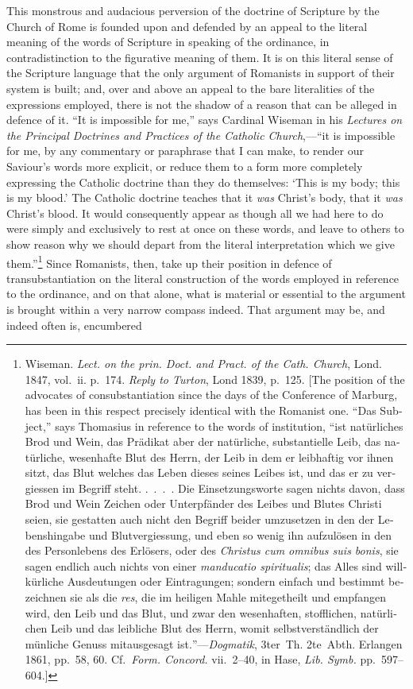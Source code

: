 \documentclass[
]{book}
\begin{document}
This monstrous and audacious perversion of the doctrine of Scripture by the Church of Rome is founded upon and defended by an appeal to the literal meaning of the words of Scripture in speaking of the ordinance, in contradistinction to the figurative meaning of them. It is on this literal sense of the Scripture language that the only argument of Romanists in support of their system is built; and, over and above an appeal to the bare literalities of the expressions employed, there is not the shadow of a reason that can be alleged in defence of it. ``It is impossible for me,'' says Cardinal Wiseman in his \emph{Lectures on the Principal Doctrines and Practices of the Catholic Church},---``it is impossible for me, by any commentary or paraphrase that I can make, to render our Saviour's words more explicit, or reduce them to a form more completely expressing the Catholic doctrine than they do themselves: `This is my body; this is my blood.' The Catholic doctrine teaches that it \emph{was} Christ's body, that it \emph{was} Christ's blood. It would consequently appear as though all we had here to do were simply and exclusively to rest at once on these words, and leave to others to show reason why we should depart from the literal interpretation which we give them.''\footnote{Wiseman. \emph{Lect. on the prin. Doct. and Pract. of the Cath. Church}, Lond. 1847, vol.~ii. p.~174. \emph{Reply to Turton}, Lond 1839, p.~125. {[}The position of the advocates of consubstantiation since the days of the Conference of Marburg, has been in this respect precisely identical with the Romanist one. ``\foreignlanguage{ngerman}{Das Subject},'' says Thomasius in reference to the words of institution, ``\foreignlanguage{ngerman}{ist natürliches Brod und Wein, das Prädikat aber der natürliche, substantielle Leib, das natürliche, wesenhafte Blut des Herrn, der Leib in dem er leibhaftig vor ihnen sitzt, das Blut welches das Leben dieses seines Leibes ist, und das er zu vergiessen im Begriff steht. .~.~.~. Die Einsetzungsworte sagen nichts davon, dass Brod und Wein Zeichen oder Unterpfänder des Leibes und Blutes Christi seien, sie gestatten auch nicht den Begriff beider umzusetzen in den der Lebenshingabe und Blutvergiessung, und eben so wenig ihn aufzulösen in den des Personlebens des Erlösers, oder des \foreignlanguage{latin}{\emph{Christus cum omnibus suis bonis}}, sie sagen endlich auch nichts von einer \foreignlanguage{latin}{\emph{manducatio spiritualis}}; das Alles sind willkürliche Ausdeutungen oder Eintragungen; sondern einfach und bestimmt bezeichnen sie als die \foreignlanguage{latin}{\emph{res}}, die im heiligen Mahle mitegetheilt und empfangen wird, den Leib und das Blut, und zwar den wesenhaften, stofflichen, natürlichen Leib und das leibliche Blut des Herrn, womit selbstverständlich der münliche Genuss mitausgesagt ist.}''---\emph{Dogmatik}, 3ter~Th. 2te~Abth. Erlangen 1861, pp.~58, 60. Cf.~\emph{Form. Concord.} vii.~2--40, in Hase, \emph{Lib. Symb.} pp.~597--604.{]}} Since Romanists, then, take up their position in defence of transubstantiation on the literal construction of the words employed in reference to the ordinance, and on that alone, what is material or essential to the argument is brought within a very narrow compass indeed. That argument may be, and indeed often is, encumbered 
\end{document}
